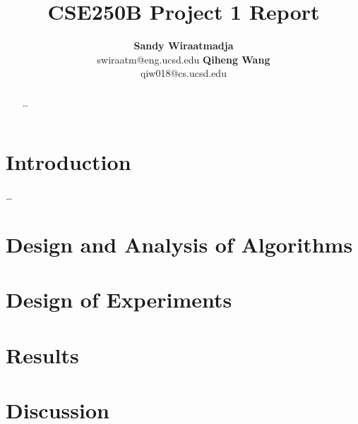 \documentclass{article} %
\title{CSE250B Project 1 Report}
\author {\textbf{Sandy Wiraatmadja}\\
	swiraatm@eng.ucsd.edu
		\And
		\textbf{Qiheng Wang}\\
		qiw018@cs.ucsd.edu
}
\begin{document}
\maketitle

\begin{abstract}
\ldots
\end{abstract}

\section{Introduction}
\ldots

\section{Design and Analysis of Algorithms}
\section{Design of Experiments}
\section{Results}
\section{Discussion}
\end{document}
